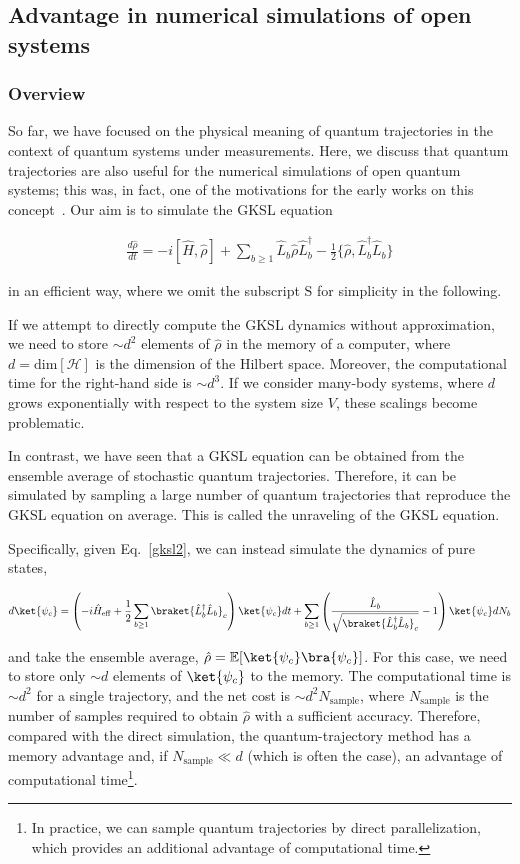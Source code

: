 \documentclass[preprint,pteplogo]{ptephy_v2}%
\numberwithin{equation}{section}
\theoremstyle{definition}
\newcommand{\ml}[1]{\mathcal{#1}}
\newcommand{\mr}[1]{\mathrm{#1}}
\newcommand{\mbb}[1]{\mathbb{#1}}
\newcommand{\lrs}[1]{\left( #1 \right)}
\newcommand{\aln}[1]{
\begin{align}
#1
\end{align}
}
\begin{document}
\subsection{Advantage in numerical simulations of open systems}
\subsubsection{Overview}
So far, we have focused on the physical meaning of quantum trajectories in the context of quantum systems under measurements.
Here, we discuss that quantum trajectories are also useful for the numerical simulations of open quantum systems; this was, in fact, one of the motivations for the early works on this concept~\cite{dalibard1992wave, dum1992monte}.
Our aim is to simulate the GKSL equation
\aln{\label{gksl2}
\frac{d\hat{\rho}}{dt}=-i[\hat{H},\hat{\rho}]+\sum_{b\geq 1}\hat{L}_b\hat{\rho}\hat{L}_b^\dag-\frac{1}{2}\{\hat{\rho},\hat{L}_b^\dag\hat{L}_b\}
}
in an efficient way, where we omit the subscript $\mr{S}$ for simplicity in the following.

If we attempt to directly compute the GKSL dynamics without approximation, we need to store $\sim d^2$ elements of $\hat{\rho}$ in the memory of a computer, where $d=\mr{dim}[\ml{H}]$ is the dimension of the Hilbert space.
Moreover, the computational time for the right-hand side is $\sim d^3$.
If we consider many-body systems, where $d$ grows exponentially with respect to the system size $V$, these scalings become problematic.

In contrast, we have seen that a GKSL equation can be obtained from the ensemble average of stochastic quantum trajectories.
Therefore, it can be simulated by sampling a large number of quantum trajectories that reproduce the GKSL equation on average.
This is called the unraveling of the GKSL equation.

Specifically, given Eq.~\eqref{gksl2}, we can instead simulate the dynamics of pure states,
\aln{\label{SSEqt}
d\ket{\psi_c}=\lrs{-i\hat{H}_\mr{eff}+\frac{1}{2}\sum_{b\geq 1}\braket{\hat{L}_b^\dag\hat{L}_b}_c}\ket{\psi_c}dt+\sum_{b\geq 1}\lrs{\frac{\hat{L}_b}{\sqrt{\braket{\hat{L}_b^\dag\hat{L}_b}_c}}-1}\ket{\psi_c}dN_b
}
and take the ensemble average, $\hat{\rho}=\mbb{E}[\ket{\psi_c}\bra{\psi_c}]$.
For this case, we need to store only $\sim d$ elements of $\ket{\psi_c}$ to the memory.
The computational time is $\sim d^2$ for a single trajectory, and the net cost is $\sim d^2 N_\mr{sample}$, where $N_\mr{sample}$ is the number of samples required to obtain $\hat{\rho}$ with a sufficient accuracy.
Therefore, compared with the direct simulation, the quantum-trajectory method has a memory advantage and, if $N_\mr{sample}\ll d$ (which is often the case), an advantage of computational time\footnote{
In practice, we can sample quantum trajectories by direct parallelization, which provides an additional advantage of computational time.
}.
\end{document}
